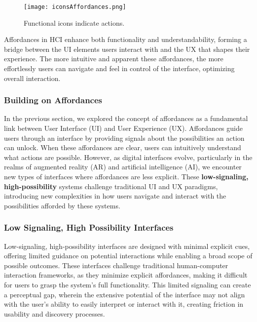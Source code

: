 \begin{figure}[!h]
    \centering
    \texttt{[image: iconsAffordances.png]}
    \caption{Functional icons indicate actions.}
    \vspace{0.1cm}
    \label{fig:affordances}
\end{figure}

Affordances in HCI enhance both functionality and understandability, forming a bridge between the UI elements users interact with and the UX that shapes their experience.
The more intuitive and apparent these affordances, the more effortlessly users can navigate and feel in control of the interface, optimizing overall interaction.

\subsubsection{Building on Affordances}

In the previous section, we explored the concept of affordances as a fundamental link between User Interface (UI) and User Experience (UX).
Affordances guide users through an interface by providing signals about the possibilities an action can unlock\cite{10.20380/gi2000.24}\cite{10.1177/1086026618803729}.
When these affordances are clear, users can intuitively understand what actions are possible.
However, as digital interfaces evolve, particularly in the realms of augmented reality (AR) and artificial intelligence (AI), we encounter new types of interfaces where affordances are less explicit.
These \textbf{low-signaling, high-possibility} systems challenge traditional UI and UX paradigms, introducing new complexities in how users navigate and interact with the possibilities afforded by these systems.

\subsubsection{ Low Signaling, High Possibility Interfaces}

Low-signaling, high-possibility interfaces are designed with minimal explicit cues, offering limited guidance on potential interactions while enabling a broad scope of possible outcomes.
These interfaces challenge traditional human-computer interaction frameworks, as they minimize explicit affordances, making it difficult for users to grasp the system's full functionality.
This limited signaling can create a perceptual gap, wherein the extensive potential of the interface may not align with the user's ability to easily interpret or interact with it, creating friction in usability and discovery processes.

